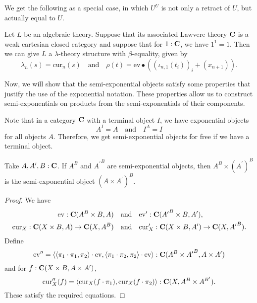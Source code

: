 We get the following as a special case, in which $ U^U $ is not only a retract of $ U $, but actually equal to $ U $.
\begin{corollary}
  Let $ L $ be an algebraic theory. Suppose that its associated Lawvere theory $ \mathbf{C} $ is a weak cartesian closed category and suppose that for $ 1 : \mathbf{C} $, we have $ 1^1 = 1 $. Then we can give $ L $ a $ \lambda $-theory structure with $ \beta $-equality, given by
  \[ \lambda_n(s) = \mathrm{cur}_n(s) \quad \text{and} \quad \rho(t) = \mathrm{ev} \bullet ((\iota_{n, 1}(t_i))_i + (x_{n + 1})). \]
\end{corollary}

Now, we will show that the semi-exponential objects satisfy some properties that justify the use of the exponential notation. These properties allow us to construct semi-exponentials on products from the semi-exponentials of their components.
\begin{remark}
  Note that in a category $ \mathbf{C} $ with a terminal object $ I $, we have exponential objects
  \[ A^I = A \quad \text{and} \quad I^A = I \]
  for all objects $ A $. Therefore, we get semi-exponential objects for free if we have a terminal object.
\end{remark}

\begin{lemma}
  Take $ A, A^\prime, B : \mathbf{C} $. If $ A^B $ and $ {A^\prime}^B $ are semi-exponential objects, then $ A^B \times (A^\prime)^B $ is the semi-exponential object $ (A \times A^\prime)^B $.
\end{lemma}
\begin{proof}
  We have
  \begin{align*}
    \mathrm{ev} : \mathbf{C}(A^B \times B, A) \quad &\text{and} \quad \mathrm{ev}^\prime : \mathbf{C}({A^\prime}^B \times B, A^\prime),\\
    \mathrm{cur}_X: \mathbf{C}(X \times B, A) \to \mathbf{C}(X, A^B) \quad &\text{and} \quad \mathrm{cur}^\prime_X: \mathbf{C}(X \times B, A^\prime) \to \mathbf{C}(X, {A^\prime}^B).
  \end{align*}
  Define
  \[ \mathrm{ev}^{\prime \prime} = \langle \langle \pi_1 \cdot \pi_1, \pi_2 \rangle \cdot \mathrm{ev}, \langle \pi_1 \cdot \pi_2, \pi_2 \rangle \cdot \mathrm{ev} \rangle : \mathbf{C}(A^B \times {A^\prime}^B, A \times A^\prime) \]
  and for $ f: \mathbf{C}(X \times B, A \times A^\prime) $,
  \[ \mathrm{cur}^{\prime \prime}_X(f) = \langle \mathrm{cur}_X(f \cdot \pi_1), \mathrm{cur}_X(f \cdot \pi_2) \rangle : \mathbf{C}(X, A^B \times A^{B^\prime}). \]
  These satisfy the required equations.
\end{proof}

